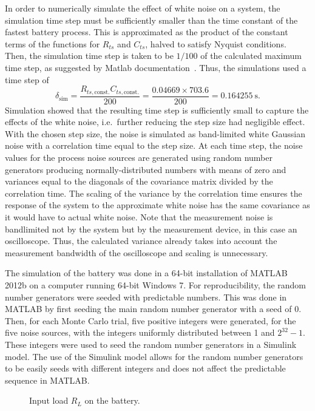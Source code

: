 \documentclass[../zhang_thesis.tex]{subfiles}
\begin{document}
In order to numerically simulate the effect of white noise on a system, the simulation time step must be sufficiently smaller than the time constant of the fastest battery process. This is approximated as the product of the constant terms of the functions for $R_{ts}$ and $C_{ts}$, halved to satisfy Nyquist conditions. Then, the simulation time step is taken to be $1/100$ of the calculated maximum time step, as suggested by Matlab documentation~\cite{matlab}. Thus, the simulations used a time step of
\begin{equation}
    \delta_\text{sim} = \frac{R_{ts,\text{const.}}C_{ts,\text{const.}}}{200} = \frac{0.04669\times 703.6}{200} = 0.164255~\text{s}.
\end{equation}
Simulation showed that the resulting time step is sufficiently small to capture the effects of the white noise, i.e.\ further reducing the step size had negligible effect. With the chosen step size, the noise is simulated as band-limited white Gaussian noise with a correlation time equal to the step size. At each time step, the noise values for the process noise sources are generated using random number generators producing normally-distributed numbers with means of zero and variances
equal to the diagonals of the covariance matrix divided by the correlation time. The scaling of the variance by the correlation time ensures the response of the system to the approximate white noise has the same covariance as it would have to actual white noise. Note that the measurement noise is bandlimited not by the system but by the measurement device, in this case an oscilloscope. Thus, the calculated variance already takes into account the measurement bandwidth of the oscilloscope and
scaling is unnecessary.

The simulation of the battery was done in a 64-bit installation of MATLAB 2012b on a computer running 64-bit Windows 7. For reproducibility, the random number generators were seeded with predictable numbers. This was done in MATLAB by first seeding the main random number generator with a seed of 0. Then, for each Monte Carlo trial, five positive integers were generated, for the five noise sources, with the integers uniformly distributed between 1 and $2^{32}-1$. These integers were used to seed the random number generators in a Simulink model. The use of the Simulink model allows for the
random number generators to be easily seeds with different integers and does not affect the predictable sequence in MATLAB.

\begin{figure}[htb]
\centering
%
\caption{Input load $R_L$ on the battery.}
\label{fig:input}
\end{figure}
\end{document}

